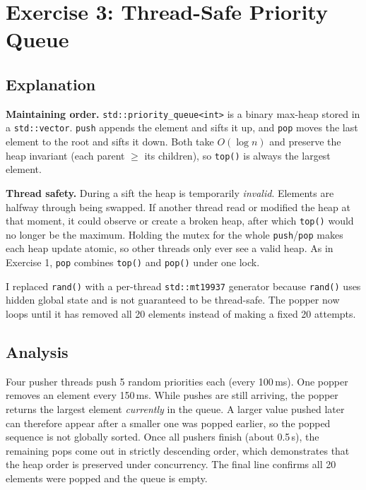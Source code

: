 \documentclass[11pt]{article}
\newcommand{\src}{../src}
\begin{document}
\section{Exercise 3: Thread-Safe Priority Queue}


\subsection*{Explanation}
\textbf{Maintaining order.} \texttt{std::priority\_queue<int>} is a binary
max-heap stored in a \texttt{std::vector}. \texttt{push} appends the element
and sifts it up, and \texttt{pop} moves the last element to the root and sifts
it down. Both take $O(\log n)$ and preserve the heap invariant (each parent
$\ge$ its children), so \texttt{top()} is always the largest element.

\textbf{Thread safety.} During a sift the heap is temporarily \emph{invalid}.
Elements are halfway through being swapped. If another thread read or modified
the heap at that moment, it could observe or create a broken heap, after which
\texttt{top()} would no longer be the maximum. Holding the mutex for the whole
\texttt{push}/\texttt{pop} makes each heap update atomic, so other threads only
ever see a valid heap. As in Exercise 1, \texttt{pop} combines \texttt{top()}
and \texttt{pop()} under one lock.

I replaced \texttt{rand()} with a per-thread \texttt{std::mt19937} generator
because \texttt{rand()} uses hidden global state and is not guaranteed to be
thread-safe. The popper now loops until it has removed all 20 elements instead
of making a fixed 20 attempts.

\subsection*{Analysis}
Four pusher threads push 5 random priorities each (every 100\,ms). One popper
removes an element every 150\,ms. While pushes are still arriving, the popper
returns the largest element \emph{currently} in the queue. A larger value
pushed later can therefore appear after a smaller one was popped earlier, so
the popped sequence is not globally sorted. Once all pushers finish (about
0.5\,s), the remaining pops come out in strictly descending order, which
demonstrates that the heap order is preserved under concurrency. The final line
confirms all 20 elements were popped and the queue is empty.
\end{document}
